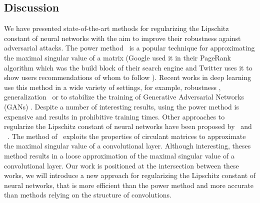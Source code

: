 \subsection{Discussion}

We have presented state-of-the-art methods for regularizing the Lipschitz constant of neural networks with the aim to improve their robustness against adversarial attacks.
The power method~\cite{golub2000eigenvalue} is a popular technique for approximating the maximal singular value of a matrix (Google used it in their PageRank algorithm \cite{page1999pagerank} which was the build block of their search engine and Twitter uses it to show users recommendations of whom to follow \cite{gupta2013wtf}).
Recent works in deep learning use this method in a wide variety of settings, for example, robustness \cite{farnia2018generalizable,tsuzuku2018lipschitz}, generalization~\cite{yoshida2017spectral,gouk2018regularisation} or to stabilize the training of Generative Adversarial Networks (GANs) \cite{miyato2018spectral}.
Despite a number of interesting results, using the power method is expensive and results in prohibitive training times. 
Other approaches to regularize the Lipschitz constant of neural networks have been proposed by~\citet{sedghi2018singular} and ~\citet{singla2019bounding}.
The method of~\citet{sedghi2018singular,singla2019bounding} exploits the properties of circulant matrices to approximate the maximal singular value of a convolutional layer.
Although interesting, theses method results in a loose approximation of the maximal singular value of a convolutional layer.
Our work is positioned at the intersection between these works, we will introduce a new approach for regularizing the Lipschitz constant of neural networks, that is more efficient than the power method and more accurate than methods relying on the structure of convolutions.







